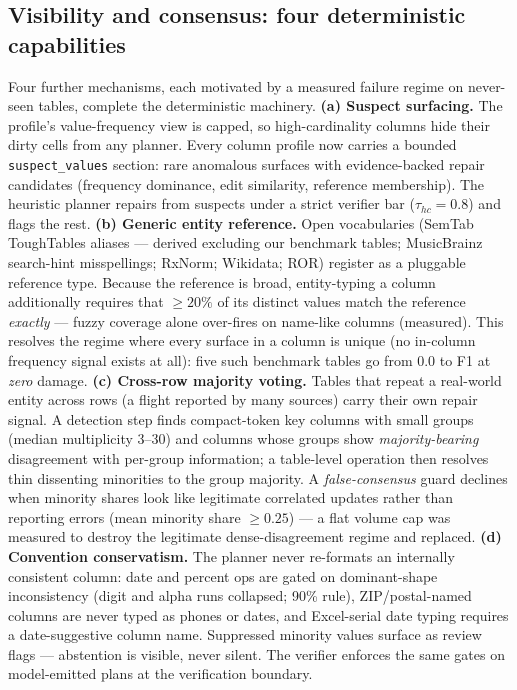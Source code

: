 \documentclass[11pt]{article}
\begin{document}
\subsection{Visibility and consensus: four deterministic capabilities}
\label{sec:capabilities}
Four further mechanisms, each motivated by a measured failure regime on never-seen
tables, complete the deterministic machinery. \textbf{(a) Suspect surfacing.} The
profile's value-frequency view is capped, so high-cardinality columns hide their
dirty cells from any planner. Every column profile now carries a bounded
\texttt{suspect\_values} section: rare anomalous surfaces with evidence-backed
repair candidates (frequency dominance, edit similarity, reference membership).
The heuristic planner repairs from suspects under a strict verifier bar
($\tau_{hc}{=}0.8$) and flags the rest. \textbf{(b) Generic entity reference.}
Open vocabularies (SemTab ToughTables aliases --- derived excluding our benchmark
tables; MusicBrainz search-hint misspellings; RxNorm; Wikidata; ROR) register as a
pluggable reference type. Because the reference is broad, entity-typing a column
additionally requires that ${\ge}20\%$ of its distinct values match the reference
\emph{exactly} --- fuzzy coverage alone over-fires on name-like columns (measured).
This resolves the regime where every surface in a column is unique (no in-column
frequency signal exists at all): five such benchmark tables go from 0.0 to
\ttFOne{} F1 at \emph{zero} damage. \textbf{(c) Cross-row majority voting.} Tables
that repeat a real-world entity across rows (a flight reported by many sources)
carry their own repair signal. A detection step finds compact-token key columns
with small groups (median multiplicity 3--30) and columns whose groups show
\emph{majority-bearing} disagreement with per-group information; a table-level
operation then resolves thin dissenting minorities to the group majority. A
\emph{false-consensus} guard declines when minority shares look like legitimate
correlated updates rather than reporting errors (mean minority share ${\ge}0.25$)
--- a flat volume cap was measured to destroy the legitimate dense-disagreement
regime and replaced. \textbf{(d) Convention conservatism.} The planner never
re-formats an internally consistent column: date and percent ops are gated on
dominant-shape inconsistency (digit and alpha runs collapsed; 90\% rule),
ZIP/postal-named columns are never typed as phones or dates, and Excel-serial
date typing requires a date-suggestive column name. Suppressed minority values
surface as review flags --- abstention is visible, never silent. The verifier
enforces the same gates on model-emitted plans at the verification boundary.
\end{document}
